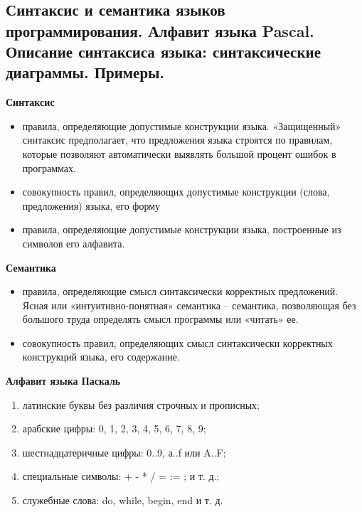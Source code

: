 


\section{}

\subsection{Синтаксис  и  семантика  языков  программирования.  Алфавит  языка  Pascal.  Описание синтаксиса языка: синтаксические диаграммы. Примеры. }

{\bf{Синтаксис}}
\begin{itemize}
\item правила, определяющие допустимые конструкции языка. «Защищенный» синтаксис предполагает, что предложения языка строятся по правилам, которые позволяют автоматически выявлять большой процент ошибок в программах.
\item совокупность правил, определяющих допустимые конструкции (слова, предложения) языка, его форму
\item правила, определяющие допустимые конструкции языка, построенные из символов его алфавита.  
\end{itemize}

{\bf{Семантика}}
\begin{itemize}
\item правила, определяющие смысл синтаксически корректных предложений. Ясная или «интуитивно-понятная» семантика – семантика, позволяющая без большого труда определять смысл программы или «читать» ее.
\item совокупность правил, определяющих смысл синтаксически корректных конструкций языка, его содержание.
\end{itemize}

{\bf{Алфавит языка Паскаль  }}

\begin{enumerate}
\item латинские буквы без различия строчных и прописных;
\item арабские цифры: 0, 1, 2, 3, 4, 5, 6, 7, 8, 9;
\item шестнадцатеричные цифры: 0..9, а..f или A..F;
\item специальные символы: + - * / = := ; и т. д.;
\item служебные слова: do, while, begin, end и т. д.
\end{enumerate}

